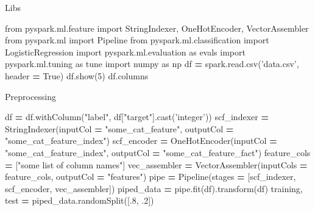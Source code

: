 \documentclass[]{book}
\newenvironment{Shaded}{\begin{snugshade}}{\end{snugshade}}
\newcommand{\DecValTok}[1]{\textcolor[rgb]{0.00,0.00,0.81}{#1}}
\newcommand{\StringTok}[1]{\textcolor[rgb]{0.31,0.60,0.02}{#1}}
\newcommand{\ImportTok}[1]{#1}
\newcommand{\VariableTok}[1]{\textcolor[rgb]{0.00,0.00,0.00}{#1}}
\newcommand{\OperatorTok}[1]{\textcolor[rgb]{0.81,0.36,0.00}{\textbf{#1}}}
\newcommand{\NormalTok}[1]{#1}
\theoremstyle{definition}
\theoremstyle{definition}
\theoremstyle{definition}
\theoremstyle{remark}
\begin{document}
Libs

\begin{Shaded}
\begin{Highlighting}[]
\ImportTok{from}\NormalTok{ pyspark.ml.feature }\ImportTok{import}\NormalTok{ StringIndexer, OneHotEncoder, VectorAssembler}
\ImportTok{from}\NormalTok{ pyspark.ml }\ImportTok{import}\NormalTok{ Pipeline}
\ImportTok{from}\NormalTok{ pyspark.ml.classification }\ImportTok{import}\NormalTok{ LogisticRegression}
\ImportTok{import}\NormalTok{ pyspark.ml.evaluation }\ImportTok{as}\NormalTok{ evals}
\ImportTok{import}\NormalTok{ pyspark.ml.tuning }\ImportTok{as}\NormalTok{ tune}
\ImportTok{import}\NormalTok{ numpy }\ImportTok{as}\NormalTok{ np}
\NormalTok{df }\OperatorTok{=}\NormalTok{ spark.read.csv(}\StringTok{'data.csv'}\NormalTok{, header }\OperatorTok{=} \VariableTok{True}\NormalTok{)}
\NormalTok{df.show(}\DecValTok{5}\NormalTok{)}
\NormalTok{df.columns}
\end{Highlighting}
\end{Shaded}

Preprocessing

\begin{Shaded}
\begin{Highlighting}[]
\NormalTok{df }\OperatorTok{=}\NormalTok{ df.withColumn(}\StringTok{"label"}\NormalTok{, df[}\StringTok{"target"}\NormalTok{].cast(}\StringTok{'integer'}\NormalTok{))}
\NormalTok{scf_indexer }\OperatorTok{=}\NormalTok{ StringIndexer(inputCol }\OperatorTok{=} \StringTok{"some_cat_feature"}\NormalTok{, outputCol }\OperatorTok{=} \StringTok{"some_cat_feature_index"}\NormalTok{)}
\NormalTok{scf_encoder }\OperatorTok{=}\NormalTok{ OneHotEncoder(inputCol }\OperatorTok{=} \StringTok{"some_cat_feature_index"}\NormalTok{, outputCol }\OperatorTok{=} \StringTok{"some_cat_feature_fact"}\NormalTok{)}
\NormalTok{feature_cols }\OperatorTok{=}\NormalTok{ [}\StringTok{"some list of column names"}\NormalTok{]}
\NormalTok{vec_assembler }\OperatorTok{=}\NormalTok{ VectorAssembler(inputCols }\OperatorTok{=}\NormalTok{ feature_cols, }
\NormalTok{                                outputCol }\OperatorTok{=} \StringTok{"features"}\NormalTok{)}
\NormalTok{pipe }\OperatorTok{=}\NormalTok{ Pipeline(stages }\OperatorTok{=}\NormalTok{ [scf_indexer, scf_encoder, vec_assembler])}
\NormalTok{piped_data }\OperatorTok{=}\NormalTok{ pipe.fit(df).transform(df)}
\NormalTok{training, test }\OperatorTok{=}\NormalTok{ piped_data.randomSplit([.}\DecValTok{8}\NormalTok{, .}\DecValTok{2}\NormalTok{])}
\end{Highlighting}
\end{Shaded}
\end{document}
